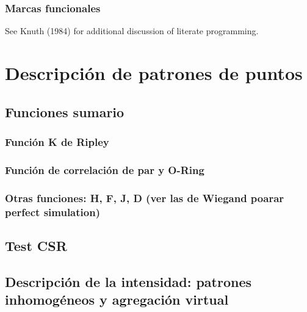 \documentclass[
  letterpaper,
  DIV=11,
  numbers=noendperiod]{scrreprt}
\begin{document}
\hypertarget{marcas-funcionales}{%
\subsection{Marcas funcionales}\label{marcas-funcionales}}

See Knuth (1984) for additional discussion of literate programming.


\hypertarget{descripciuxf3n-de-patrones-de-puntos}{%
\chapter{Descripción de patrones de
puntos}\label{descripciuxf3n-de-patrones-de-puntos}}

\hypertarget{funciones-sumario}{%
\section{Funciones sumario}\label{funciones-sumario}}

\hypertarget{funciuxf3n-k-de-ripley}{%
\subsection{Función K de Ripley}\label{funciuxf3n-k-de-ripley}}

\hypertarget{funciuxf3n-de-correlaciuxf3n-de-par-y-o-ring}{%
\subsection{Función de correlación de par y
O-Ring}\label{funciuxf3n-de-correlaciuxf3n-de-par-y-o-ring}}

\hypertarget{otras-funciones-h-f-j-d-ver-las-de-wiegand-poarar-perfect-simulation}{%
\subsection{Otras funciones: H, F, J, D (ver las de Wiegand poarar
perfect
simulation)}\label{otras-funciones-h-f-j-d-ver-las-de-wiegand-poarar-perfect-simulation}}

\hypertarget{test-csr}{%
\section{Test CSR}\label{test-csr}}

\hypertarget{descripciuxf3n-de-la-intensidad-patrones-inhomoguxe9neos-y-agregaciuxf3n-virtual}{%
\section{Descripción de la intensidad: patrones inhomogéneos y
agregación
virtual}\label{descripciuxf3n-de-la-intensidad-patrones-inhomoguxe9neos-y-agregaciuxf3n-virtual}}
\end{document}
